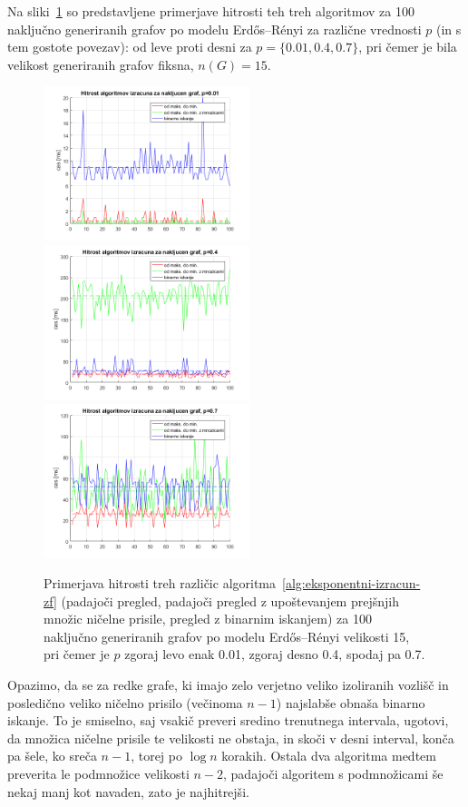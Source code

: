 \documentclass[12pt,a4paper,twoside]{article}
\theoremstyle{definition} %
\theoremstyle{plain} %
\numberwithin{equation}{section}  %
\begin{document}
Na sliki~\ref{fig:eksp-alg-primerjava} so predstavljene primerjave hitrosti teh treh algoritmov za 100 naključno generiranih grafov po modelu Erdős–Rényi za različne vrednosti $p$ (in s tem gostote povezav): od leve proti desni za $p=\{ 0.01, 0.4, 0.7 \}$, pri čemer je bila velikost generiranih grafov fiksna, $n(G) = 15$.
\begin{figure}[h]
    \centering
    \includegraphics[width=170pt]{koda/results/plots/zfn_random_15_sparse.png}
    \includegraphics[width=170pt]{koda/results/plots/zfn_random_15_mid.png}
    \includegraphics[width=170pt]{koda/results/plots/zfn_random_15_dense.png}
    \caption{Primerjava hitrosti treh različic algoritma~\ref{alg:eksponentni-izracun-zf} (padajoči pregled, padajoči pregled z upoštevanjem prejšnjih množic ničelne prisile, pregled z binarnim iskanjem) za 100 naključno generiranih grafov po modelu Erdős–Rényi velikosti 15, pri čemer je $p$ zgoraj levo enak 0.01, zgoraj desno 0.4, spodaj pa 0.7.}
    \label{fig:eksp-alg-primerjava}
\end{figure}
Opazimo, da se za redke grafe, ki imajo zelo verjetno veliko izoliranih vozlišč in posledično veliko ničelno prisilo (večinoma $n-1$) najslabše obnaša binarno iskanje. To je smiselno, saj vsakič preveri sredino trenutnega intervala, ugotovi, da množica ničelne prisile te velikosti ne obstaja, in skoči v desni interval, konča pa šele, ko sreča $n-1$, torej po $\log n$ korakih. Ostala dva algoritma medtem preverita le podmnožice velikosti $n-2$, padajoči algoritem s podmnožicami še nekaj manj kot navaden, zato je najhitrejši.
\end{document}
